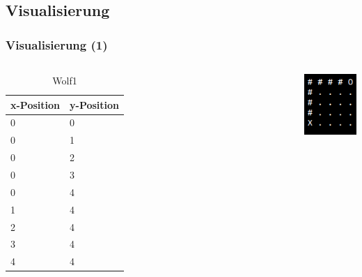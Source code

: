 \documentclass{beamer}
\begin{document}
\subsection{Visualisierung}
\begin{frame}
\frametitle{Visualisierung (1)}
\begin{columns}[c] %

\begin{table}
\begin{tabular}{l l}
\toprule
\textbf{x-Position} & \textbf{y-Position}\\
\midrule
 0 & 0 \\
0 & 1 \\
0 & 2 \\
0 & 3 \\
0 & 4 \\
1 & 4 \\
2 & 4 \\
3 & 4 \\
4 & 4 \\
\bottomrule
\end{tabular}
\caption{Wolf1}
\end{table}

\includegraphics[scale=1,natwidth=610,natheight=642]{wolf_route_bsp.png}
\end{columns}

\end{frame}
\end{document}
